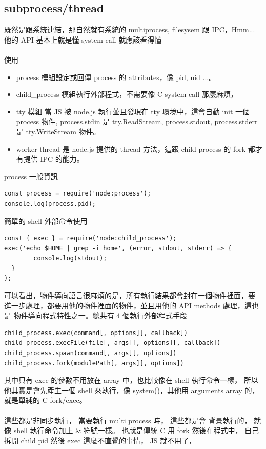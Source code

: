   \subsection{subprocess/thread}
  既然是跟系統連結，那自然就有系統的 multiprocess, filesysem 跟 IPC，Hmm...
  他的 API 基本上就是懂 system call 就應該看得懂
  \\\\
  使用
  \begin{itemize}
    \item process 模組設定或回傳 process 的 attributes，像 pid, uid ...。
    \item child\_process 模組執行外部程式，不需要像 C system call 那麼麻煩，
    \item tty 模組 當 JS 被 node.js 執行並且發現在 tty 環境中，這會自動 init
      一個 process 物件, process.stdin 是 tty.ReadStream, process.stdout,
      process.stderr 是 tty.WriteStream 物件。
    \item worker thread 是 node.js 提供的 thread 方法，這跟 child process 的
      fork 都才有提供 IPC 的能力。
  \end{itemize}
  process 一般資訊
  \begin{verbatim}
const process = require('node:process');
console.log(process.pid);
  \end{verbatim}
  簡單的 shell 外部命令使用
  \begin{verbatim}
const { exec } = require('node:child_process');
exec('echo $HOME | grep -i home', (error, stdout, stderr) => {
        console.log(stdout);
  }
);
  \end{verbatim}
  可以看出，物件導向語言很麻煩的是，所有執行結果都會封在一個物件裡面，要
  進一步處理，都要用他的物件裡面的物件，並且用他的 API methods 處理，這也是
  物件導向程式特性之一。總共有 4 個執行外部程式手段
  \begin{verbatim}
child_process.exec(command[, options][, callback])
child_process.execFile(file[, args][, options][, callback])
child_process.spawn(command[, args][, options])
child_process.fork(modulePath[, args][, options])
  \end{verbatim}
  其中只有 exec 的參數不用放在 array 中，也比較像在 shell 執行命令一樣，
  所以他其實是會先產生一個 shell 來執行，像 system()，其他用 arguments
  array 的，就是單純的 C fork/exec。
  \\\\
  這些都是非同步執行， 當要執行 multi process 時， 這些都是會
  背景執行的， 就像 shell 執行命令加上 \& 符號一樣。 也就是傳統 C 用 fork
  然後在程式中， 自己拆開 child pid 然後 exec 這麼不直覺的事情， JS 就不用了，

